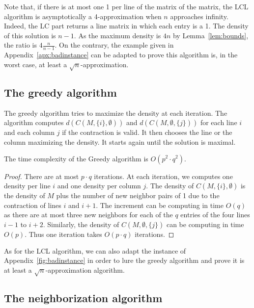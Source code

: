 \begin{remark}
	Note that, if there is at most one 1 per line of the matrix of the matrix, the LCL algorithm is asymptotically a 4-approximation when $n$ approaches infinity. Indeed, the LC part returns a line matrix in which each entry is a 1. The density of this solution is $n-1$. As the maximum density is $4n$ by Lemma~\ref{lem:bounds}, the ratio is $4\frac{n}{n-1}$. On the contrary, the example given in Appendix~\ref{apx:badinstance} can be adapted to prove this algorithm is, in the worst case, at least a $\sqrt{n}$-approximation. 
\end{remark} 

\subsection{The greedy algorithm}

The greedy algorithm tries to maximize the density at each iteration. The algorithm computes $d(C(M,\{i\},\emptyset))$ and $d(C(M,\emptyset, \{j\}))$ for each line $i$ and each column $j$ if the contraction is valid. It then chooses the line or the column maximizing the density. It starts again until the solution is maximal.

\begin{theorem}
	The time complexity of the Greedy algorithm is $O(p^2 \cdot q^2)$. 
\end{theorem}
\begin{proof}
	There are at most $p \cdot q$ iterations. At each iteration, we computes one density per line $i$ and one density per column $j$. The density of $C(M,\{i\},\emptyset)$ is the density of $M$ plus the number of new neighbor pairs of 1 due to the contraction of lines $i$ and $i+1$. The increment can be computing in time $O(q)$ as there are at most three new neighbors for each of the $q$ entries of the four lines $i-1$ to $i+2$. Similarly, the density of $C(M,\emptyset,\{j\})$ can be computing in time $O(p)$. Thus one iteration takes $O(p \cdot q)$ iterations. 
\end{proof}

\begin{remark}
	As for the LCL algorithm, we can also adapt the instance of Appendix~\ref{fig:badinstance} in order to lure the greedy algorithm and prove it is at least a $\sqrt{n}$-approximation algorithm.
\end{remark}

\subsection{The neighborization algorithm}

